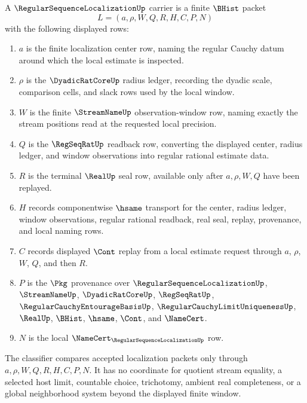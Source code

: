 \begin{definition}
\label{def:regular-sequence-localization-carrier}
A $\RegularSequenceLocalizationUp$ carrier is a finite $\BHist$ packet
$$
L=(a,\rho,W,Q,R,H,C,P,N)
$$
with the following displayed rows:
\begin{enumerate}
\item $a$ is the finite localization center row, naming the regular Cauchy datum around which the local estimate is inspected.
\item $\rho$ is the $\DyadicRatCoreUp$ radius ledger, recording the dyadic scale, comparison cells, and slack rows used by the local window.
\item $W$ is the finite $\StreamNameUp$ observation-window row, naming exactly the stream positions read at the requested local precision.
\item $Q$ is the $\RegSeqRatUp$ readback row, converting the displayed center, radius ledger, and window observations into regular rational estimate data.
\item $R$ is the terminal $\RealUp$ seal row, available only after $a,\rho,W,Q$ have been replayed.
\item $H$ records componentwise $\hsame$ transport for the center, radius ledger, window observations, regular rational readback, real seal, replay, provenance, and local naming rows.
\item $C$ records displayed $\Cont$ replay from a local estimate request through $a$, $\rho$, $W$, $Q$, and then $R$.
\item $P$ is the $\Pkg$ provenance over $\RegularSequenceLocalizationUp$, $\StreamNameUp$, $\DyadicRatCoreUp$, $\RegSeqRatUp$, $\RegularCauchyEntourageBasisUp$, $\RegularCauchyLimitUniquenessUp$, $\RealUp$, $\BHist$, $\hsame$, $\Cont$, and $\NameCert$.
\item $N$ is the local $\NameCert_{\RegularSequenceLocalizationUp}$ row.
\end{enumerate}
The classifier compares accepted localization packets only through $a,\rho,W,Q,R,H,C,P,N$. It has no coordinate for quotient stream equality, a selected host limit, countable choice, trichotomy, ambient real completeness, or a global neighborhood system beyond the displayed finite window.
\end{definition}

